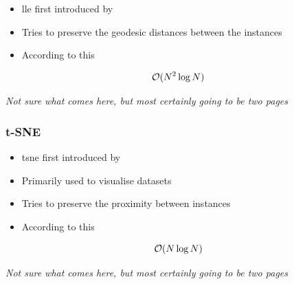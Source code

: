 \begin{itemize}
	\item \Gls{lle} first introduced by \cite{tenenbaum2000global}
	\item Tries to preserve the geodesic distances between the instances \cite{HandsOnMLCh8}
	\item According to this \cite{DRUnsupervisedNearestNeighbors}
\end{itemize}

$$\mathcal{O}(N^2 \log N)$$

\clearpage

\begin{center}
	\textit{Not sure what comes here, but most certainly going to be two pages}
\end{center}

\clearpage



\subsubsection{t-SNE}

\begin{itemize}
	\item \gls{tsne} first introduced by \cite{van2008visualizing}
	\item Primarily used to visualise datasets
	\item Tries to preserve the proximity between instances \cite{HandsOnMLCh8}
	\item According to this \cite{van2014accelerating}
\end{itemize}

$$\mathcal{O}(N \log N)$$

\clearpage

\begin{center}
	\textit{Not sure what comes here, but most certainly going to be two pages}
\end{center}

\clearpage
